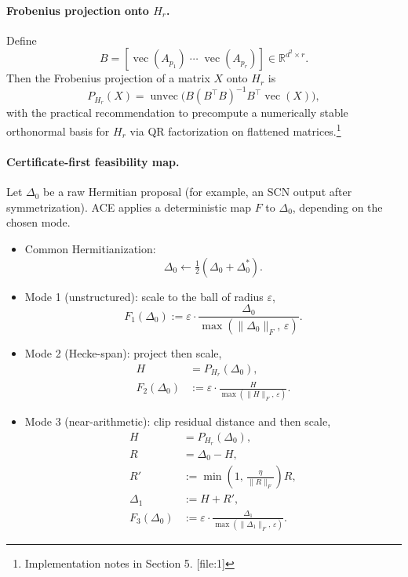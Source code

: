 \documentclass[11pt]{article}
\begin{document}
\paragraph{Frobenius projection onto \(H_r\).} Define
\[
B = [\operatorname{vec}(A_{p_1}) \; \cdots \; \operatorname{vec}(A_{p_r})] \in \mathbb{R}^{d^2\times r}.
\]
Then the Frobenius projection of a matrix \(X\) onto \(H_r\) is
\[
P_{H_r}(X) = \operatorname{unvec}\bigl(B(B^\top B)^{-1} B^\top \operatorname{vec}(X)\bigr),
\]
with the practical recommendation to precompute a numerically stable orthonormal basis for \(H_r\) via QR factorization on flattened matrices.\footnote{Implementation notes in Section 5. [file:1]}

\paragraph{Certificate-first feasibility map.} Let \(\Delta_0\) be a raw Hermitian proposal (for example, an SCN output after symmetrization). ACE applies a deterministic map \(F\) to \(\Delta_0\), depending on the chosen mode.

\begin{itemize}[leftmargin=*]
  \item Common Hermitianization:
  \[
  \Delta_0 \leftarrow \tfrac12(\Delta_0 + \Delta_0^*).
  \]
  \item Mode 1 (unstructured): scale to the ball of radius \(\varepsilon\),
  \[
  F_1(\Delta_0) := \varepsilon \cdot \frac{\Delta_0}{\max(\|\Delta_0\|_F,\, \varepsilon)}.
  \]
  \item Mode 2 (Hecke-span): project then scale,
  \begin{align*}
    H &= P_{H_r}(\Delta_0), \\
    F_2(\Delta_0) &:= \varepsilon \cdot \frac{H}{\max(\|H\|_F,\, \varepsilon)}.
  \end{align*}
  \item Mode 3 (near-arithmetic): clip residual distance and then scale,
  \begin{align*}
    H &= P_{H_r}(\Delta_0), \\
    R &= \Delta_0 - H, \\
    R' &:= \min\!\left(1,\, \frac{\eta}{\|R\|_F}\right) R, \\
    \Delta_1 &:= H + R', \\
    F_3(\Delta_0) &:= \varepsilon \cdot \frac{\Delta_1}{\max(\|\Delta_1\|_F,\, \varepsilon)}.
  \end{align*}
\end{itemize}
\end{document}
